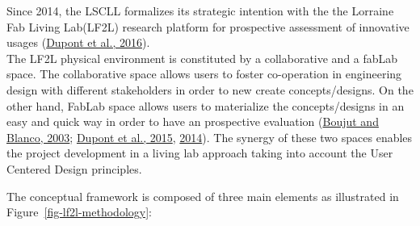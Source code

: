 \documentclass[
  11pt,
]{article}
\begin{document}
Since 2014, the LSCLL formalizes its strategic intention with the the
Lorraine Fab Living Lab\textregistered    (LF2L\textregistered) research
platform for prospective assessment of innovative usages
(\protect\hyperlink{ref-Dupont2016}{Dupont et al., 2016}).\\
The LF2L physical environment is constituted by a collaborative and a
fabLab space. The collaborative space allows users to foster
co-operation in engineering design with different stakeholders in order
to new create concepts/designs. On the other hand, FabLab space allows
users to materialize the concepts/designs in an easy and quick way in
order to have an prospective evaluation
(\protect\hyperlink{ref-Boujut2003}{Boujut and Blanco, 2003};
\protect\hyperlink{ref-Dupont2015b}{Dupont et al., 2015},
\protect\hyperlink{ref-Dupont2014}{2014}). The synergy of these two
spaces enables the project development in a living lab approach taking
into account the User Centered Design principles.

The conceptual framework is composed of three main elements as
illustrated in Figure~\ref{fig-lf2l-methodology}:
\end{document}
